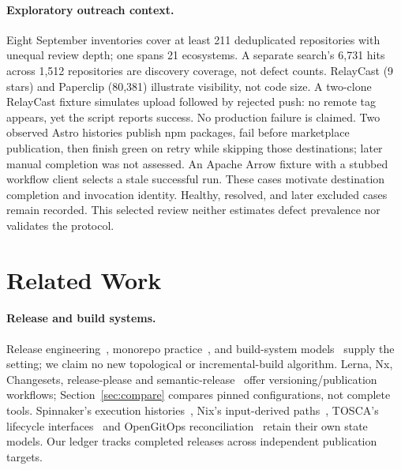 \paragraph{Exploratory outreach context.}
Eight September inventories cover at least 211 deduplicated repositories with
unequal review depth; one spans 21 ecosystems. A separate search's 6,731 hits
across 1,512 repositories are discovery coverage, not defect counts.
RelayCast (9 stars) and Paperclip (80,381) illustrate visibility, not code size.
A two-clone RelayCast fixture simulates upload followed by rejected push:
no remote tag appears, yet the script reports success. No production failure
is claimed. Two observed Astro histories publish npm packages, fail before
marketplace publication, then finish green on retry while skipping those
destinations; later manual completion was not assessed. An Apache Arrow
fixture with a stubbed workflow client selects a stale successful run.
These cases motivate destination completion and invocation identity.
Healthy, resolved, and later excluded cases remain recorded. This selected
review neither estimates defect prevalence nor validates the protocol.

\section{Related Work}
\label{sec:related}
\paragraph{Release and build systems.}
Release engineering~\cite{adams}, monorepo practice~\cite{potvin}, and build-system
models~\cite{mokhov,pluto} supply the setting; we claim no new topological or
incremental-build algorithm. Lerna, Nx, Changesets, release-please and
semantic-release~\cite{lerna,nx,changesets,releaseplease,semanticrelease} offer
versioning/publication workflows; Section~\ref{sec:compare} compares pinned
configurations, not complete tools. Spinnaker's execution histories~\cite{spinnaker},
Nix's input-derived paths~\cite{nix}, TOSCA's lifecycle interfaces~\cite{tosca}
and OpenGitOps reconciliation~\cite{gitops} retain their own state models.
Our ledger tracks completed releases across independent publication targets.

